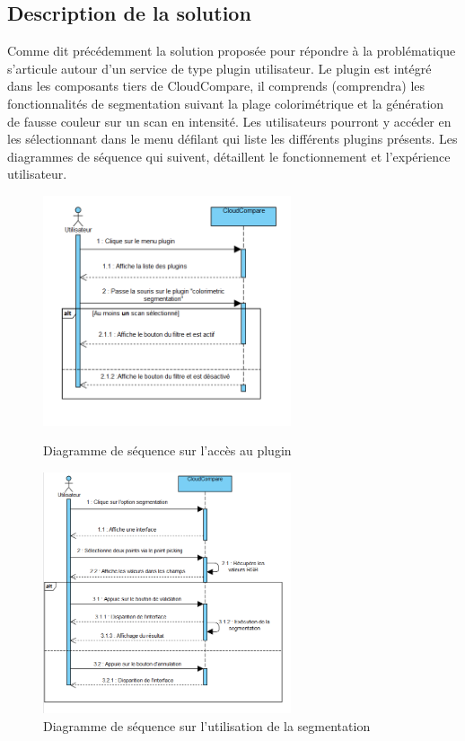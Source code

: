 \documentclass[12pt,titlepage,french]{article}
\begin{document}
\subsection{Description de la solution}
Comme dit précédemment la solution proposée pour répondre à la problématique s'articule autour d'un service de type plugin utilisateur. Le plugin est intégré dans les composants tiers de CloudCompare, il comprends (comprendra) les fonctionnalités de segmentation suivant la plage colorimétrique et la génération de fausse couleur sur un scan en intensité. Les utilisateurs pourront y accéder en les sélectionnant dans le menu défilant qui liste les différents plugins présents. Les diagrammes de séquence qui suivent, détaillent le fonctionnement et l'expérience utilisateur.



\begin{figure}[!hbtp]
\center
\includegraphics[width=0.65\textwidth]{sequDiagPlugin.PNG}
    \caption{\label{} Diagramme de séquence sur l'accès au plugin}
    
  \includegraphics[width=0.65\textwidth]{sequDiagrSegmentation.PNG}
  \caption{\label{} Diagramme de séquence sur l'utilisation de la segmentation}
\end{figure}
\end{document}
